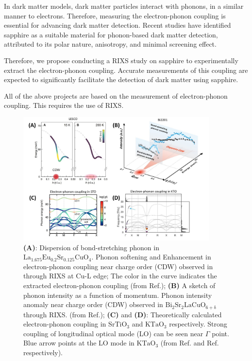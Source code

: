 \documentclass[11pt]{article}
\begin{document}
In dark matter models, dark matter particles interact with phonons, in a similar manner to electrons\cite{griffin_directional_2018}. Therefore, measuring the electron-phonon coupling is essential for advancing dark matter detection. Recent studies have identified sapphire as a suitable material for phonon-based dark matter detection, attributed to its polar nature, anisotropy, and minimal screening effect\cite{griffin_directional_2018}.
  
Therefore, we propose conducting a RIXS study on sapphire to experimentally extract the electron-phonon coupling. Accurate measurements of this coupling are expected to significantly facilitate the detection of dark matter using sapphire.

All of the above projects are based on the measurement of electron-phonon coupling. This requires the use of RIXS.
\begin{figure}[!t]
    \centering
    \includegraphics[width=0.9\textwidth]{figures/figure1.jpg}
    \caption{\textbf{(A)}: Dispersion of bond-stretching phonon in $\mathrm{La_{1.675}Eu_{0.2}Sr_{0.125}CuO_{4}}$. Phonon softening and Enhancement in electron-phonon coupling near charge order (CDW) observed in  through RIXS at Cu-L edge; The color in the curve indicates the extracted electron-phonon coupling (from Ref.\cite{wang_charge_2021}); \textbf{(B)} A sketch of phonon intensity as a function of momentum. Phonon intensity anomaly near charge order (CDW) observed in $\mathrm{Bi_2Sr_2LaCuO_{6+\delta}}$ through RIXS.  (from Ref.\cite{li_multiorbital_2020}); \textbf{(C)} and \textbf{(D)}: Theoretically calculated electron-phonon coupling in $\mathrm{SrTiO_3}$ and $\mathrm{KTaO_3}$ respectively. Strong coupling of longitudinal optical mode (LO) can be seen near $\Gamma$ point. Blue arrow points at the LO mode in  $\mathrm{KTaO_3}$ (from Ref.\cite{zhou_electron-phonon_2018} and Ref.\cite{esswein_first-principles_2023} respectively).}  
    \label{first_figure}
\end{figure}
\end{document}
